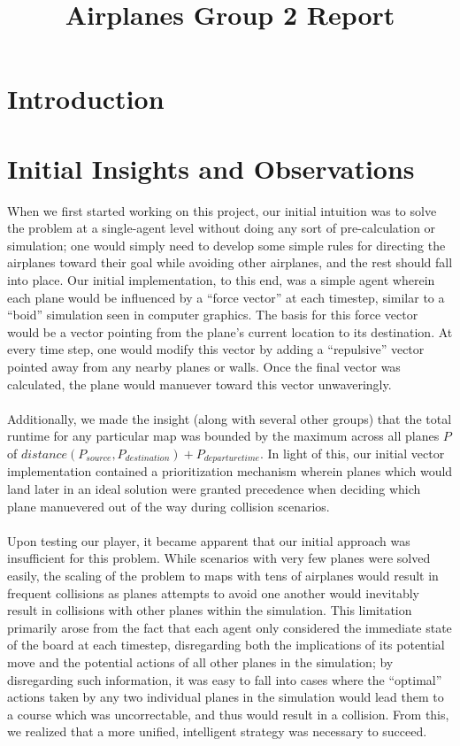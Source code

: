 \documentclass[10pt]{article}
\title{Airplanes Group 2 Report}
\author{\myname}
\begin{document}
\pagestyle{empty}
\maketitle

\newpage
\pagestyle{fancy}
\setlength\headheight{60pt}
\setcounter{tocdepth}{3}
\tableofcontents

\newpage
\section{Introduction}

\newpage
\section{Initial Insights and Observations}
When we first started working on this project, our initial intuition was to solve the problem 
at a single-agent level without doing any sort of pre-calculation or simulation; one would 
simply need to develop some simple rules for directing the airplanes toward their goal while
avoiding other airplanes, and the rest should fall into place. Our initial implementation, to
this end, was a simple agent wherein each plane would be influenced by a ``force vector'' at each
timestep, similar to a ``boid'' simulation seen in computer graphics. The basis for this force
vector would be a vector pointing from the plane's current location to its destination. At every
time step, one would modify this vector by adding a ``repulsive'' vector pointed away from any
nearby planes or walls. Once the final vector was calculated, the plane would manuever toward
this vector unwaveringly. \\\\
Additionally, we made the insight (along with several other groups) that the total runtime for
any particular map was bounded by the maximum across all planes $P$ of $distance(P_{source}, 
P_{destination}) + P_{departure time}$. In light of this, our initial vector implementation 
contained a prioritization mechanism wherein planes which would land later in an ideal solution
were granted precedence when deciding which plane manuevered out of the way during collision 
scenarios.\\\\
Upon testing our player, it became apparent that our initial approach was insufficient for this
problem. While scenarios with very few planes were solved easily, the scaling of the problem to
maps with tens of airplanes would result in frequent collisions as planes attempts to avoid one
another would inevitably result in collisions with other planes within the simulation. This 
limitation primarily arose from the fact that each agent only considered the immediate state
of the board at each timestep, disregarding both the implications of its potential move and
the potential actions of all other planes in the simulation; by disregarding such information,
it was easy to fall into cases where the ``optimal'' actions taken by any two individual planes 
in the simulation would lead them to a course which was uncorrectable, and thus would result in
a collision. From this, we realized that a more unified, intelligent strategy was necessary to
succeed.
\end{document}
